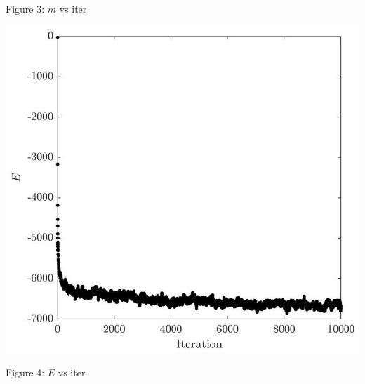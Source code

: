\documentclass[12pt]{article}
\begin{document}
Figure 3: $m$ vs iter

\begin{center}
\includegraphics[max width=\textwidth]{2024_03_02_8c82830fbe70d4921a9fg-5}
\end{center}

Figure 4: $E$ vs iter
\end{document}
